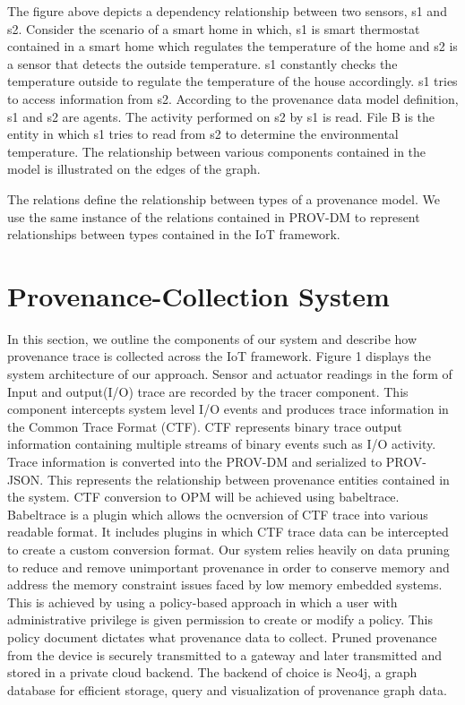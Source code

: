 The figure above depicts a dependency relationship between two sensors, s1 and s2. Consider the scenario of a smart home in which, s1 is smart thermostat contained in a smart home which regulates the temperature of the home and s2 is a sensor that detects the outside temperature. s1 constantly checks the temperature outside to regulate the temperature of the house accordingly. s1 tries to access information from s2. According to the provenance data model  definition, s1 and s2 are agents. The activity performed on s2 by s1 is read. File B is the entity in which s1 tries to read from s2 to determine the environmental temperature. The relationship between various components contained in the model is illustrated on the edges of the graph.

\par The relations define the relationship between types of a provenance model. We use the same instance of the relations contained in PROV-DM to represent relationships between types contained in the IoT framework.


\section{Provenance-Collection System}

In this section, we outline the components of our system and describe how provenance trace is collected across the IoT framework. Figure 1 displays the system architecture of our approach. Sensor and actuator readings in the form of Input and output(I/O) trace are recorded by the tracer component. This component intercepts system level I/O events and produces trace information in the Common Trace Format (CTF). CTF represents binary trace output information containing multiple streams of binary events such as I/O activity. Trace information is converted into the PROV-DM and serialized to PROV-JSON. This represents the relationship between provenance entities contained in the system. CTF conversion to OPM will be achieved using babeltrace. Babeltrace is a plugin which allows the ocnversion of CTF trace into various readable format. It includes plugins in which CTF trace data can be intercepted to create a custom conversion format. Our system relies heavily on data pruning to reduce and remove unimportant provenance in order to conserve memory and address the memory constraint issues faced by low memory embedded systems. This is achieved by using a policy-based approach in which a user with administrative privilege is given permission to create or modify a policy. This policy document dictates what provenance data to collect. Pruned provenance from the device is securely transmitted to a gateway and later transmitted and stored in a private cloud backend. The backend of choice is Neo4j, a graph database for efficient storage, query and visualization of provenance graph data.

